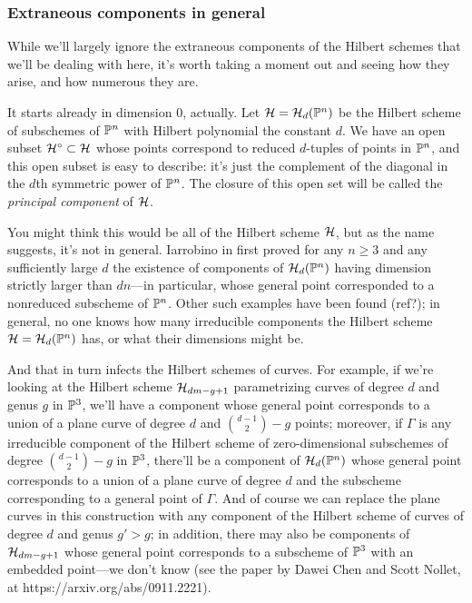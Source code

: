 \subsubsection{Extraneous components in general}

While we'll largely ignore the extraneous components of the Hilbert schemes that we'll be dealing with here, it's worth taking a moment out and seeing how they arise, and how numerous they are.

It starts already in dimension 0, actually. Let $\cH = \cH_d(\PP^n)$ be the Hilbert scheme of subschemes of $\PP^n$ with Hilbert polynomial the constant $d$. We have an open subset $\cH^\circ \subset \cH$ whose points correspond to reduced $d$-tuples of points in $\PP^n$, and this open subset is easy to describe: it's just the complement of the diagonal in the $d$th symmetric power of $\PP^n$. The closure of this open set will be called the \emph{principal component} of $\cH$.

You might think this would be all of the Hilbert scheme $\cH$, but as the name suggests, it's not in general. Iarrobino in \cite{Iarrobino1985} first proved  for any $n \geq 3$ and any sufficiently large $d$ the existence of components of $\cH_d(\PP^n)$ having dimension strictly larger than $dn$---in particular, whose general point corresponded to a nonreduced subscheme of $\PP^n$. Other such examples have been found (ref?); in general, no one knows how many irreducible components the Hilbert scheme $\cH = \cH_d(\PP^n)$ has, or what their dimensions might be.

And that in turn infects the Hilbert schemes of curves. For example, if we're looking at the Hilbert scheme $\cH_{dm-g+1}$ parametrizing curves of degree $d$ and genus $g$ in $\PP^3$, we'll have a component whose general point corresponds to a union of a plane curve of degree $d$ and $\binom{d-1}{2} - g$ points; moreover, if $\Gamma$ is any irreducible component of the Hilbert scheme of zero-dimensional subschemes of degree $\binom{d-1}{2} - g$ in $\PP^3$, there'll be a component of $\cH_d(\PP^n)$ whose  general point corresponds to a union of a plane curve of degree $d$ and the subscheme corresponding to a general point of $\Gamma$. And of course we can replace the plane curves in this construction with any component of the Hilbert scheme of curves of degree $d$ and genus $g' > g$; in addition, there may also be components of $\cH_{dm-g+1}$ whose general point corresponds to a subscheme of $\PP^3$ with an embedded point---we don't know (see the paper by Dawei Chen and Scott Nollet, at https://arxiv.org/abs/0911.2221).

